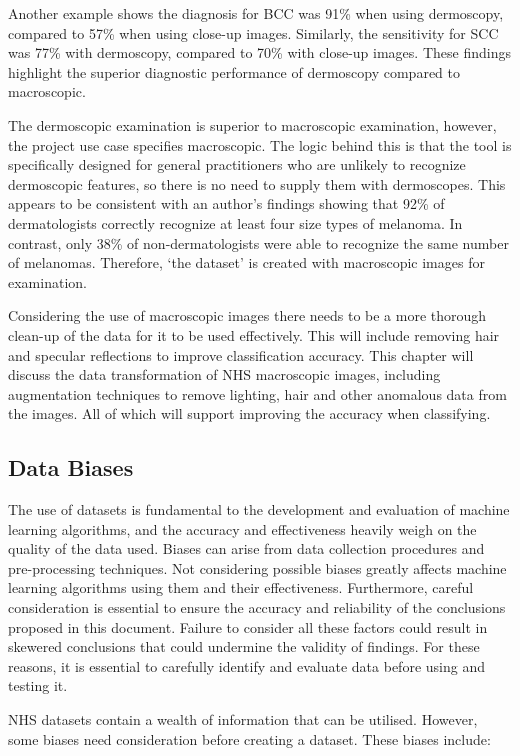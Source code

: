Another example shows the diagnosis for BCC was 91\% when using dermoscopy, compared to 57\% when using close-up images\cite{Dascalu2022}. Similarly, the sensitivity for SCC was 77\% with dermoscopy, compared to 70\% with close-up images\cite{Dascalu2022}. These findings highlight the superior diagnostic performance of dermoscopy compared to macroscopic.

The dermoscopic examination is superior to macroscopic examination, however, the project use case specifies macroscopic. The logic behind this is that the tool is specifically designed for general practitioners who are unlikely to recognize dermoscopic features, so there is no need to supply them with dermoscopes. This appears to be consistent with an author's findings showing that 92\% of dermatologists correctly recognize at least four size types of melanoma. In contrast, only 38\% of non-dermatologists were able to recognize the same number of melanomas\cite{Tae2019}. Therefore, `the dataset' is created with macroscopic images for examination.

Considering the use of macroscopic images there needs to be a more thorough clean-up of the data for it to be used effectively. This will include removing hair and specular reflections to improve classification accuracy. This chapter will discuss the data transformation of NHS macroscopic images, including augmentation techniques to remove lighting, hair and other anomalous data from the images. All of which will support improving the accuracy when classifying.

\subsection{Data Biases}
The use of datasets is fundamental to the development and evaluation of machine learning algorithms, and the accuracy and effectiveness heavily weigh on the quality of the data used. Biases can arise from data collection procedures and pre-processing techniques. Not considering possible biases greatly affects machine learning algorithms using them and their effectiveness. Furthermore, careful consideration is essential to ensure the accuracy and reliability of the conclusions proposed in this document. Failure to consider all these factors could result in skewered conclusions that could undermine the validity of findings. For these reasons, it is essential to carefully identify and evaluate data before using and testing it.

NHS datasets contain a wealth of information that can be utilised. However, some biases need consideration before creating a dataset. These biases include:

